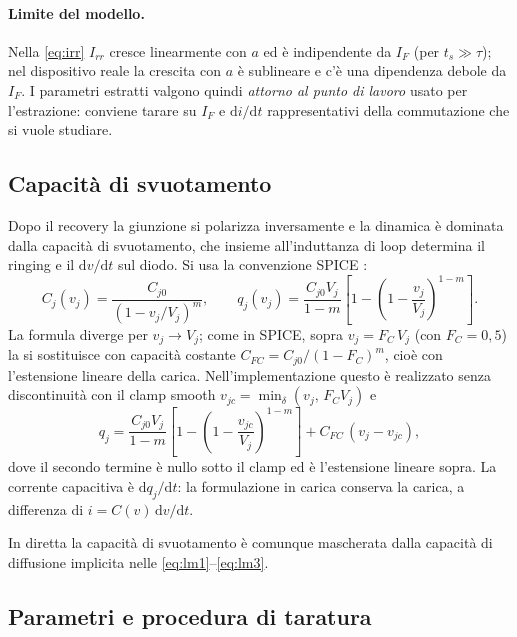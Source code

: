 \documentclass[11pt,a4paper]{article}
\newcommand{\ud}{\mathrm{d}}
\begin{document}
\paragraph{Limite del modello.}
Nella \eqref{eq:irr} $I_{rr}$ cresce linearmente con $a$ ed \`e
indipendente da $I_F$ (per $t_s \gg \tau$); nel dispositivo reale la
crescita con $a$ \`e sublineare e c'\`e una dipendenza debole da $I_F$.
I parametri estratti valgono quindi \emph{attorno al punto di lavoro}
usato per l'estrazione: conviene tarare su $I_F$ e $\ud i/\ud t$
rappresentativi della commutazione che si vuole studiare.

\subsection{Capacit\`a di svuotamento}
\label{sec:depl}

Dopo il recovery la giunzione si polarizza inversamente e la dinamica
\`e dominata dalla capacit\`a di svuotamento, che insieme all'induttanza
di loop determina il ringing e il $\ud v/\ud t$ sul diodo. Si usa la
convenzione SPICE \cite{massobrio}:
\begin{equation}
C_j(v_j) = \frac{C_{j0}}{\left(1 - v_j/V_j\right)^{m}},
\qquad
q_j(v_j) = \frac{C_{j0} V_j}{1-m}
\left[ 1 - \left(1 - \frac{v_j}{V_j}\right)^{1-m} \right].
\end{equation}
La formula diverge per $v_j \to V_j$; come in SPICE, sopra
$v_j = F_C\, V_j$ (con $F_C = 0{,}5$) la si sostituisce con capacit\`a
costante $C_{FC} = C_{j0}/(1-F_C)^m$, cio\`e con l'estensione lineare
della carica. Nell'implementazione questo \`e realizzato senza
discontinuit\`a con il clamp smooth
$v_{jc} = \min_\delta(v_j,\, F_C V_j)$ e
\begin{equation}
q_j = \frac{C_{j0} V_j}{1-m}
\left[ 1 - \left(1 - \frac{v_{jc}}{V_j}\right)^{1-m} \right]
+ C_{FC}\,(v_j - v_{jc}),
\end{equation}
dove il secondo termine \`e nullo sotto il clamp ed \`e l'estensione
lineare sopra. La corrente capacitiva \`e $\ud q_j/\ud t$: la
formulazione in carica conserva la carica, a differenza di
$i = C(v)\,\ud v/\ud t$.

In diretta la capacit\`a di svuotamento \`e comunque mascherata dalla
capacit\`a di diffusione implicita nelle \eqref{eq:lm1}--\eqref{eq:lm3}.

\subsection{Parametri e procedura di taratura}
\end{document}
